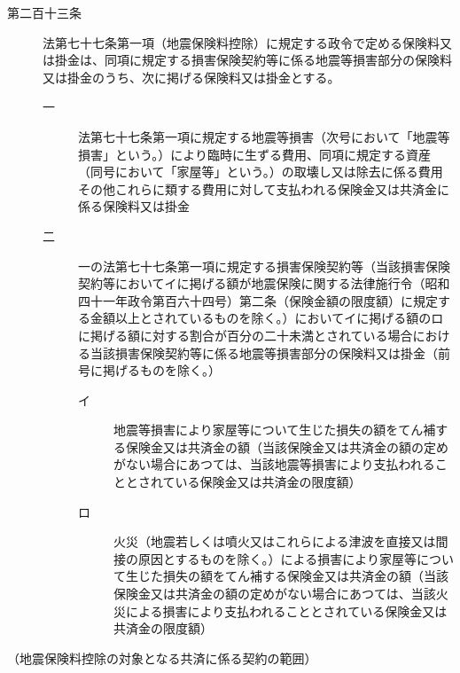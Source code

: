 \documentclass[twocolumn,a4j,10pt]{ltjtarticle}
\begin{document}
\begin{description}
\item[第二百十三条]法第七十七条第一項（地震保険料控除）に規定する政令で定める保険料又は掛金は、同項に規定する損害保険契約等に係る地震等損害部分の保険料又は掛金のうち、次に掲げる保険料又は掛金とする。
\begin{description}
\item[一]法第七十七条第一項に規定する地震等損害（次号において「地震等損害」という。）により臨時に生ずる費用、同項に規定する資産（同号において「家屋等」という。）の取壊し又は除去に係る費用その他これらに類する費用に対して支払われる保険金又は共済金に係る保険料又は掛金
\item[二]一の法第七十七条第一項に規定する損害保険契約等（当該損害保険契約等においてイに掲げる額が地震保険に関する法律施行令（昭和四十一年政令第百六十四号）第二条（保険金額の限度額）に規定する金額以上とされているものを除く。）においてイに掲げる額のロに掲げる額に対する割合が百分の二十未満とされている場合における当該損害保険契約等に係る地震等損害部分の保険料又は掛金（前号に掲げるものを除く。）
\begin{description}
\item[イ]地震等損害により家屋等について生じた損失の額をてん補する保険金又は共済金の額（当該保険金又は共済金の額の定めがない場合にあつては、当該地震等損害により支払われることとされている保険金又は共済金の限度額）
\item[ロ]火災（地震若しくは噴火又はこれらによる津波を直接又は間接の原因とするものを除く。）による損害により家屋等について生じた損失の額をてん補する保険金又は共済金の額（当該保険金又は共済金の額の定めがない場合にあつては、当該火災による損害により支払われることとされている保険金又は共済金の限度額）
\end{description}
\end{description}
\end{description}
\noindent\hspace{10pt}（地震保険料控除の対象となる共済に係る契約の範囲）
\end{document}

